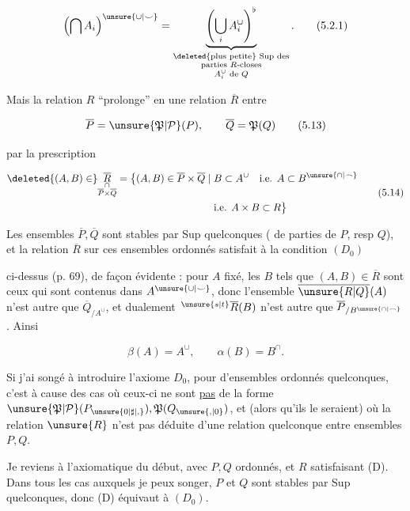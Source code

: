 \[
 \left(\bigcap A_i\right)^{\unsure{\cup|\smile}}=
 \underbrace{\left(\bigcup_i A_i^\cup\right)^\flat}_{
 \substack{\text{\deleted{plus petite} Sup des}\\\text{parties }R\text{-closes}\\A_i^\cup\text{ de }Q}}.
 \tag*{(5.2.1)}
\]

Mais la relation $R$  ``prolonge'' en une relation $\overline R$ entre

\[
 \overline P=\unsure{\mathfrak P|\mathcal P}(P),\qquad\overline Q=\mathfrak P(Q)
 \tag*{(5.13)}
\]

par la prescription

\[
\begin{aligned}
 \deleted{(A,B)\in}\underset{\substack{\cap\\\overline P\times\overline Q}}{\overline R}
  =\big\{(A,B)\in\overline P\times\overline Q\mid{}&
  B\subset A^\cup\quad\text{i.e. }A\subset B^{\unsure{\cap|\frown}}\\
 &\text{i.e. }A\times B\subset R\big\}
\end{aligned}
\tag*{(5.14)}
\]

 Les ensembles $\overline P,\overline Q$ sont stables par Sup quelconques ( de parties de $P$, resp $Q$), et la relation $\overline R$ sur ces ensembles ordonnés satisfait à la condition $(D_0)$

ci-dessus (p. 69), de façon évidente : pour $A$ fixé, les $B$ tels que $(A,B)\in\overline R$ sont ceux qui sont contenus dans $A^{\unsure{\cup|\smile}}$, donc l'ensemble $\overline{\unsure{R|Q}}(A)$ n'est autre que $\overline Q_{/A^\cup}$, et dualement $\,{}^{\unsure{s|t}}\overline R(B)$ n'est autre que $\overline P_{/B^{\unsure{\cap|\frown}}}$. Ainsi

\[
 \beta(A)=A^\cup,\qquad\alpha(B)=B^\cap.
 \tag*{(5.14)}
\]

Si j'ai songé à introduire  l'axiome $D_0$, pour   d'ensembles ordonnés quelconques, c'est à cause des cas où ceux-ci ne sont \uline{pas} de la forme $\unsure{\mathfrak P|\mathcal P}(P_{\unsure{0|\sharp|,}}),\mathfrak P(Q_{\unsure{,|0}})$, et (alors  qu'ils le seraient) où la relation $\unsure{R}$  n'est pas déduite  d'une relation quelconque entre ensembles $P,Q$.

Je reviens  à l'axiomatique du début, avec $P,Q$ ordonnés, et $R$ satisfaisant (D). Dans tous les cas auxquels je peux songer, $P$ et $Q$ sont stables par Sup quelconques, donc (D) équivaut à $(D_0)$.

